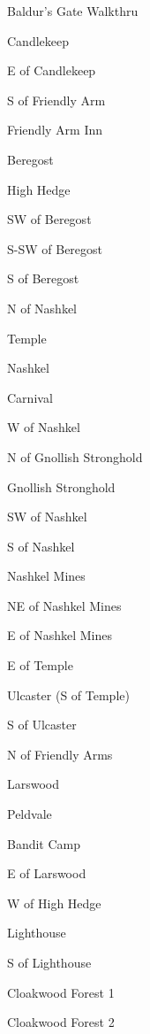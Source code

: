 \documentclass[10pt,a4,twoside]{book}
\begin{document}

\begin{center}
{\Huge Baldur's Gate Walkthru}
\end{center}


\begin{multicols}{3} %
\begin{titlepage}
\begin{trivlist}
\item Candlekeep
\item E of Candlekeep
\item S of Friendly Arm
\item Friendly Arm Inn
\item Beregost
\item High Hedge
\item SW of Beregost
\item S-SW of Beregost
\item S of Beregost
\item N of Nashkel
\item Temple
\item Nashkel
\item Carnival
\item W of Nashkel
\item N of Gnollish Stronghold
\item Gnollish Stronghold
\item SW of Nashkel
\item S of Nashkel
\item Nashkel Mines
\item NE of Nashkel Mines
\item E of Nashkel Mines
\item E of Temple
\item Ulcaster (S of Temple)
\item S of Ulcaster
\item N of Friendly Arms
\item Larswood
\item Peldvale
\item Bandit Camp
\item E of Larswood
\item W of High Hedge
\item Lighthouse
\item S of Lighthouse
\item Cloakwood Forest 1
\item Cloakwood Forest 2

\end{trivlist}
\end{titlepage}
\end{multicols}
\end{document}
